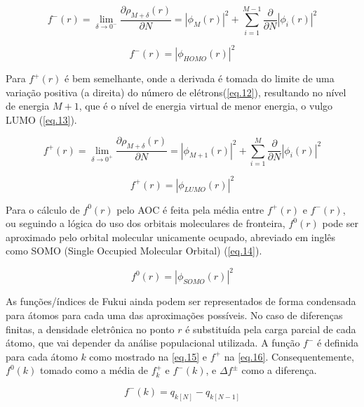 \documentclass[a4paper,11pt]{refart}
\begin{document}
\begin{equation}
f^{-}(r) = \lim_{\delta \to 0^-} \frac{\partial \rho_{M+\delta}(r)}{\partial N} = |\phi_{M}(r)|^2  +\sum_{i=1}^{M-1} \frac{\partial}{\partial N} |\phi_i(r)|^2
\label{eq.10}
\end{equation}

\begin{equation}
f^{-}(r) = |\phi_{HOMO}(r)|^2 
\label{eq.11}
\end{equation}

Para $f^{+}(r)$ é bem semelhante, onde a derivada é tomada do limite de uma variação positiva (a direita) do número de elétrons(\autoref{eq.12}), resultando no nível de energia $M+1$, que é o nível de energia virtual de menor energia, o vulgo LUMO (\autoref{eq.13}).

\begin{equation}
f^{+}(r) = \lim_{\delta \to 0^+} \frac{\partial \rho_{M+\delta}(r)}{\partial N}	 =  |\phi_{M+1}(r)|^2  + \sum_{i=1}^{M} \frac{\partial}{\partial N} |\phi_i(r)|^2
\label{eq.12}
\end{equation}

\begin{equation}
f^{+}(r) = |\phi_{LUMO}(r)|^2 
\label{eq.13}
\end{equation}

Para o cálculo de $f^{0}(r)$ pelo AOC é feita pela média entre $f^{+}(r)$ e $f^{-}(r)$, ou seguindo a lógica do uso dos orbitais moleculares de fronteira, $f^{0}(r)$ pode ser aproximado pelo orbital molecular unicamente ocupado, abreviado em inglês como SOMO (Single Occupied Molecular Orbital) (\autoref{eq.14}).

\begin{equation}
f^{0}(r) = |\phi_{SOMO}(r)|^2 
\label{eq.14}
\end{equation}

As funções/índices de Fukui ainda podem ser representados de forma condensada para átomos para cada uma das aproximações possíveis. No caso de diferenças finitas, a densidade eletrônica no ponto $r$ é substituída pela carga parcial de cada átomo, que vai depender da análise populacional utilizada. A função $f^{-}$ é definida para cada átomo $k$ como mostrado na \autoref{eq.15} e $f^{+}$ na \autoref{eq.16}. Consequentemente, $f^{0}(k)$ tomado como a média de $f^{+}_k$ e $f^{-}(k)$, e $\Delta f^{\pm}$ como a diferença.

\begin{equation}
f^{-}(k) = q_{k [N]} - q_{k [N-1]}
\label{eq.15}
\end{equation}
\end{document}

